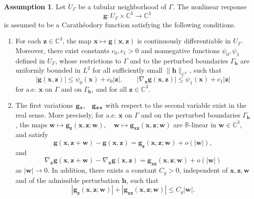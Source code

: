 \documentclass[12pt,reqno]{amsart}
\theoremstyle{definition}
\newtheorem{assu}{Assumption}
\numberwithin{equation}{section}
\begin{document}
\begin{assu}\label{ass:enhanced_g}
Let \(U_\Gamma\) be a tubular neighborhood of \(\Gamma\). The nonlinear
response
\[
\mathbf g:U_\Gamma\times\mathbb C^3\to\mathbb C^3
\]
is assumed to be a Carath\'eodory function satisfying the following
conditions.

\begin{enumerate}
\item[\textup{(A1)}]
For each \(\boldsymbol z\in\mathbb C^3\), the map
$\boldsymbol x\mapsto \mathbf g(\boldsymbol x,\boldsymbol z)$
is continuously differentiable in \(U_\Gamma\). Moreover, there exist
constants \(c_0,c_1>0\) and nonnegative functions
\(\psi_0,\psi_1\) defined in \(U_\Gamma\), whose restrictions to
\(\Gamma\) and to the perturbed boundaries \(\Gamma_{\mathbf h}\) are
uniformly bounded in \(L^2\) for all sufficiently small
\(\|\mathbf h\|_{C^1}\), such that
\[
|\mathbf g(\boldsymbol x,\boldsymbol z)|
\le
\psi_0(\boldsymbol x)+c_0|\boldsymbol z|,\qquad
|\nabla_{\boldsymbol x}\mathbf g(\boldsymbol x,\boldsymbol z)|
\le
\psi_1(\boldsymbol x)+c_1|\boldsymbol z|
\]
for a.e. \(\boldsymbol x\) on \(\Gamma\) and on \(\Gamma_{\mathbf h}\), and
for all \(\boldsymbol z\in\mathbb C^3\).

\item[\textup{(A2)}]
The first variations
$\mathbf g_{\boldsymbol z}\text,\quad
\mathbf g_{\boldsymbol x\boldsymbol z}$
with respect to the second variable exist in the real sense. More precisely,
for a.e. \(\boldsymbol x\) on \(\Gamma\) and on the perturbed boundaries
\(\Gamma_{\mathbf h}\), the maps
$
\boldsymbol w\mapsto
\mathbf g_{\boldsymbol z}(\boldsymbol x,\boldsymbol z;\boldsymbol w),
\quad
\boldsymbol w\mapsto
\mathbf g_{\boldsymbol x\boldsymbol z}
(\boldsymbol x,\boldsymbol z;\boldsymbol w)
$
are \(\mathbb R\)-linear in \(\boldsymbol w\in\mathbb C^3\), and satisfy
\[
\mathbf g(\boldsymbol x,\boldsymbol z+\boldsymbol w)
-
\mathbf g(\boldsymbol x,\boldsymbol z)
=
\mathbf g_{\boldsymbol z}
(\boldsymbol x,\boldsymbol z;\boldsymbol w)
+
o(|\boldsymbol w|),
\]
and
\[
\nabla_{\boldsymbol x}\mathbf g
(\boldsymbol x,\boldsymbol z+\boldsymbol w)
-
\nabla_{\boldsymbol x}\mathbf g
(\boldsymbol x,\boldsymbol z)
=
\mathbf g_{\boldsymbol x\boldsymbol z}
(\boldsymbol x,\boldsymbol z;\boldsymbol w)
+
o(|\boldsymbol w|)
\]
as \(|\boldsymbol w|\to0\). In addition, there exists a constant
\(C_g>0\), independent of \(\boldsymbol x,\boldsymbol z,\boldsymbol w\) and
of the admissible perturbation \(\mathbf h\), such that
\[
|\mathbf g_{\boldsymbol z}
(\boldsymbol x,\boldsymbol z;\boldsymbol w)|
+
|\mathbf g_{\boldsymbol x\boldsymbol z}
(\boldsymbol x,\boldsymbol z;\boldsymbol w)|
\le
C_g|\boldsymbol w|.
\]


\end{enumerate}
\end{assu}
\end{document}
